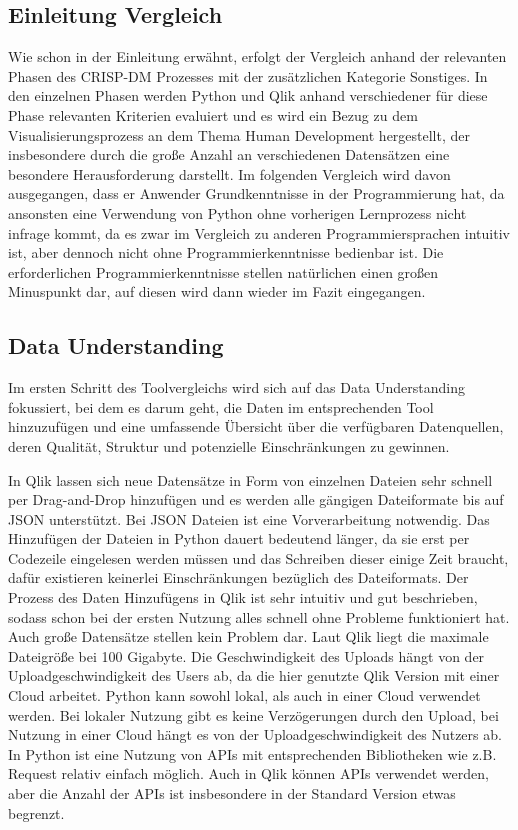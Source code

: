 \documentclass[12pt]{article}
\begin{document}
	\subsection{Einleitung Vergleich}
	Wie schon in der Einleitung erwähnt, erfolgt der Vergleich anhand der relevanten Phasen des CRISP-DM Prozesses mit der zusätzlichen Kategorie Sonstiges. In den einzelnen Phasen werden Python und Qlik anhand verschiedener für diese Phase relevanten Kriterien evaluiert und es wird ein Bezug zu dem Visualisierungsprozess an dem Thema Human Development hergestellt, der insbesondere durch die große Anzahl an verschiedenen Datensätzen eine besondere Herausforderung darstellt. Im folgenden Vergleich wird davon ausgegangen, dass er Anwender Grundkenntnisse in der Programmierung hat, da ansonsten eine Verwendung von Python ohne vorherigen Lernprozess nicht infrage kommt, da es zwar im Vergleich zu anderen Programmiersprachen intuitiv ist, aber dennoch nicht ohne Programmierkenntnisse bedienbar ist. Die erforderlichen Programmierkenntnisse stellen natürlichen einen großen Minuspunkt dar, auf diesen wird dann wieder im Fazit eingegangen.
	
	\subsection{Data Understanding}
	Im ersten Schritt des Toolvergleichs wird sich auf das Data Understanding fokussiert, bei dem es darum geht, die Daten im entsprechenden Tool hinzuzufügen und eine umfassende Übersicht über die verfügbaren Datenquellen, deren Qualität, Struktur und potenzielle Einschränkungen zu gewinnen.

	In Qlik lassen sich neue Datensätze in Form von einzelnen Dateien sehr schnell per Drag-and-Drop hinzufügen und es werden alle gängigen Dateiformate bis auf JSON unterstützt. Bei JSON Dateien ist eine Vorverarbeitung notwendig. Das Hinzufügen der Dateien in Python dauert bedeutend länger, da sie erst per Codezeile eingelesen werden müssen und das Schreiben dieser einige Zeit braucht, dafür existieren keinerlei Einschränkungen bezüglich des Dateiformats.
	Der Prozess des Daten Hinzufügens in Qlik ist sehr intuitiv und gut beschrieben, sodass schon bei der ersten Nutzung alles schnell ohne Probleme funktioniert hat. Auch große Datensätze stellen kein Problem dar. Laut Qlik liegt die maximale Dateigröße bei 100 Gigabyte. Die Geschwindigkeit des Uploads hängt von der Uploadgeschwindigkeit des Users ab, da die hier genutzte Qlik Version mit einer Cloud arbeitet. Python kann sowohl lokal, als auch in einer Cloud verwendet werden. Bei lokaler Nutzung gibt es keine Verzögerungen durch den Upload, bei Nutzung in einer Cloud hängt es von der Uploadgeschwindigkeit des Nutzers ab.
	In Python ist eine Nutzung von APIs mit entsprechenden Bibliotheken wie z.B. Request relativ einfach möglich.
	Auch in Qlik können APIs verwendet werden, aber die Anzahl der APIs ist insbesondere in der Standard Version etwas begrenzt.
	
\end{document}
